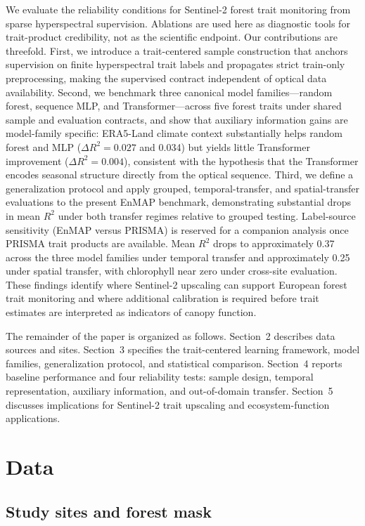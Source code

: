 \documentclass[final,times,onecolumn, authoryear]{elsarticle}
\begin{document}
\begin{linenumbers}
We evaluate the reliability conditions for Sentinel-2 forest trait monitoring from sparse hyperspectral supervision. Ablations are used here as diagnostic tools for trait-product credibility, not as the scientific endpoint. Our contributions are threefold. First, we introduce a trait-centered sample construction that anchors supervision on finite hyperspectral trait labels and propagates strict train-only preprocessing, making the supervised contract independent of optical data availability. Second, we benchmark three canonical model families---random forest, sequence MLP, and Transformer---across five forest traits under shared sample and evaluation contracts, and show that auxiliary information gains are model-family specific: ERA5-Land climate context substantially helps random forest and MLP ($\Delta R^2=0.027$ and 0.034) but yields little Transformer improvement ($\Delta R^2=0.004$), consistent with the hypothesis that the Transformer encodes seasonal structure directly from the optical sequence. Third, we define a generalization protocol and apply grouped, temporal-transfer, and spatial-transfer evaluations to the present EnMAP benchmark, demonstrating substantial drops in mean $R^2$ under both transfer regimes relative to grouped testing. Label-source sensitivity (EnMAP versus PRISMA) is reserved for a companion analysis once PRISMA trait products are available. Mean $R^2$ drops to approximately 0.37 across the three model families under temporal transfer and approximately 0.25 under spatial transfer, with chlorophyll near zero under cross-site evaluation. These findings identify where Sentinel-2 upscaling can support European forest trait monitoring and where additional calibration is required before trait estimates are interpreted as indicators of canopy function.

The remainder of the paper is organized as follows. Section~2 describes data sources and sites. Section~3 specifies the trait-centered learning framework, model families, generalization protocol, and statistical comparison. Section~4 reports baseline performance and four reliability tests: sample design, temporal representation, auxiliary information, and out-of-domain transfer. Section~5 discusses implications for Sentinel-2 trait upscaling and ecosystem-function applications.

\section{Data}

\subsection{Study sites and forest mask}


\end{linenumbers}
\end{document}
